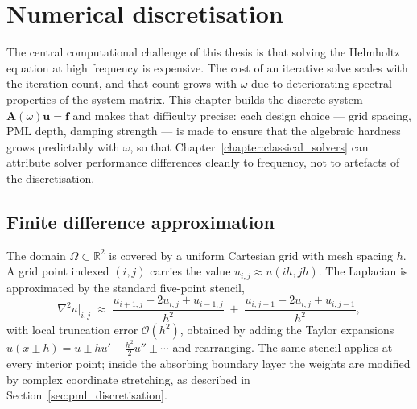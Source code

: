 %

\chapter{Numerical discretisation}
\label{chapter:discretisation}

The central computational challenge of this thesis is that solving
the Helmholtz equation at high frequency is expensive. The cost of
an iterative solve scales with the iteration count, and that count
grows with $\omega$ due to deteriorating spectral properties of the
system matrix. This chapter builds the discrete system
$\mathbf{A}(\omega)\mathbf{u} = \mathbf{f}$ and makes that
difficulty precise: each design choice --- grid spacing, PML depth,
damping strength --- is made to ensure that the algebraic hardness
grows predictably with $\omega$, so that Chapter~\ref{chapter:classical_solvers}
can attribute solver performance differences cleanly to frequency,
not to artefacts of the discretisation.


\section{Finite difference approximation}
\label{sec:fd_discretisation}

The domain $\Omega \subset \mathbb{R}^2$ is covered by a uniform
Cartesian grid with mesh spacing $h$. A grid point indexed $(i,j)$
carries the value $u_{i,j} \approx u(ih,jh)$. The Laplacian is
approximated by the standard five-point stencil,
\begin{equation}
    \nabla^2 u\big|_{i,j}
    \;\approx\;
    \frac{u_{i+1,j} - 2u_{i,j} + u_{i-1,j}}{h^2}
    \;+\;
    \frac{u_{i,j+1} - 2u_{i,j} + u_{i,j-1}}{h^2},
    \label{eq:fd_stencil}
\end{equation}
with local truncation error $\mathcal{O}(h^2)$, obtained by
adding the Taylor expansions $u(x \pm h) = u \pm hu' + \tfrac{h^2}{2}u'' \pm
\cdots$ and rearranging. The same stencil applies at every interior
point; inside the absorbing boundary layer the weights are modified
by complex coordinate stretching, as described in
Section~\ref{sec:pml_discretisation}.

